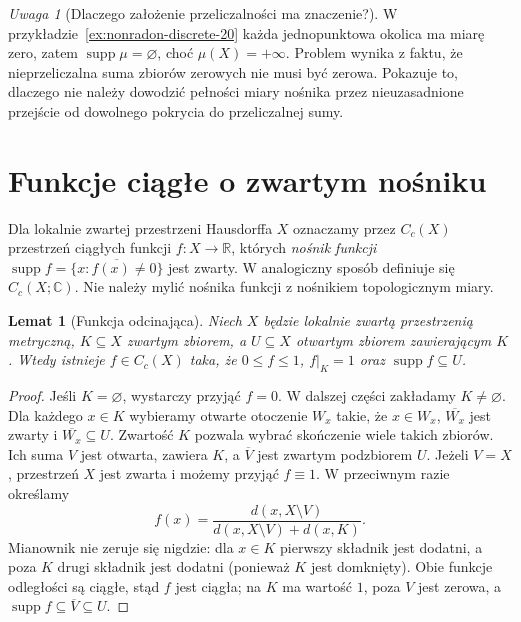 \documentclass[11pt,a4paper,oneside]{book}
\numberwithin{equation}{chapter}
\theoremstyle{plain}
\newtheorem{lemat}[twierdzenie]{Lemat}
\theoremstyle{definition}
\theoremstyle{remark}
\newtheorem{uwaga}[twierdzenie]{Uwaga}
\begin{document}
\begin{uwaga}[Dlaczego założenie przeliczalności ma znaczenie?]
W przykładzie~\ref{ex:nonradon-discrete-20} każda
jednopunktowa okolica ma miarę zero, zatem
$\operatorname{supp}\mu=\varnothing$, choć
$\mu(X)=+\infty$. Problem wynika z faktu, że
nieprzeliczalna suma zbiorów zerowych nie musi być
zerowa. Pokazuje to, dlaczego nie należy dowodzić
pełności miary nośnika przez nieuzasadnione przejście
od dowolnego pokrycia do przeliczalnej sumy.
\end{uwaga}

\section{Funkcje ciągłe o zwartym nośniku}
Dla lokalnie zwartej przestrzeni Hausdorffa $X$ oznaczamy
przez $C_c(X)$ przestrzeń ciągłych funkcji
$f:X\to\mathbb R$, których \emph{nośnik funkcji}
$\operatorname{supp}f=\overline{\{x:f(x)\neq0\}}$
jest zwarty. W analogiczny sposób definiuje się
$C_c(X;\mathbb C)$. Nie należy mylić nośnika funkcji
z nośnikiem topologicznym miary.

\begin{lemat}[Funkcja odcinająca]
\label{lem:cutoff-radon-20}
Niech $X$ będzie lokalnie zwartą przestrzenią metryczną,
$K\subseteq X$ zwartym zbiorem, a $U\subseteq X$
otwartym zbiorem zawierającym $K$. Wtedy istnieje
$f\in C_c(X)$ taka, że $0\le f\le1$, $f|_K=1$
oraz $\operatorname{supp}f\subseteq U$.
\end{lemat}
\begin{proof}
Jeśli $K=\varnothing$, wystarczy przyjąć $f=0$.
W dalszej części zakładamy $K\neq\varnothing$.
Dla każdego $x\in K$ wybieramy otwarte otoczenie
$W_x$ takie, że $x\in W_x$, $\overline{W_x}$ jest
zwarty i $\overline{W_x}\subseteq U$.
Zwartość $K$ pozwala wybrać skończenie wiele takich
zbiorów. Ich suma $V$ jest otwarta, zawiera $K$,
a $\overline V$ jest zwartym podzbiorem $U$.
Jeżeli $V=X$, przestrzeń $X$ jest zwarta
i możemy przyjąć $f\equiv1$. W przeciwnym razie
określamy
\[
 f(x)=\frac{d(x,X\setminus V)}
 {d(x,X\setminus V)+d(x,K)}.
\]
Mianownik nie zeruje się nigdzie: dla $x\in K$
pierwszy składnik jest dodatni, a poza $K$ drugi
składnik jest dodatni (ponieważ $K$ jest domknięty).
Obie funkcje odległości są ciągłe, stąd $f$ jest
ciągła; na $K$ ma wartość $1$, poza $V$ jest zerowa,
a $\operatorname{supp}f\subseteq\overline V\subseteq U$.
\end{proof}
\end{document}
